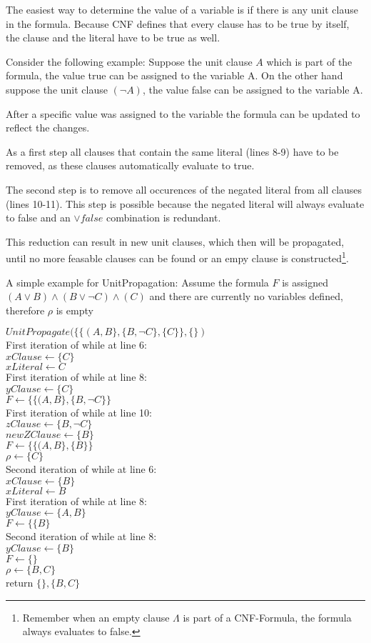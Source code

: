 The easiest way to determine the value of a variable is if there is any unit clause in the formula. Because CNF defines that every clause has to be true by itself, the clause and the literal have to be true as well.

Consider the following example: Suppose the unit clause $A$ which is part of the formula, the value true can be assigned to the variable A. On the other hand suppose the unit clause $(\lnot A)$, the value false can be assigned to the variable A.

After a specific value was assigned to the variable the formula can be updated to reflect the changes. 

As a first step all clauses that contain the same literal (lines 8-9) have to be removed, as these clauses automatically evaluate to true. 

The second step is to remove all occurences of the negated literal from all clauses (lines 10-11). This step is possible because the negated literal will always evaluate to false and an $\lor false$ combination is redundant.

This reduction can result in new unit clauses, which then will be propagated, until no more feasable clauses can be found or an empy clause is constructed\footnote{Remember when an empty clause $\Lambda$ is part of a CNF-Formula, the formula always evaluates to false.}.

A simple example for UnitPropagation: 
Assume the formula $F$ is assigned $(A \lor B ) \land (B \lor \lnot C) \land (C)$ and there are currently no variables defined, therefore $\rho$ is empty

$UnitPropagate(\{\{(A,B\}, \{B, \lnot C\},\{C\}\}, \{\})$\\
First iteration of while at line 6: \\
$xClause \gets \{C\}$\\
$xLiteral \gets C$\\
First iteration of while at line 8:\\
$yClause \gets \{C\}$\\
$F \gets \{\{(A,B\}, \{B, \lnot C\}\}$\\
First iteration of while at line 10:\\
$zClause \gets \{B, \lnot C\}$ \\
$newZClause \gets \{B\}$\\
$F \gets \{\{(A,B\}, \{B\}\}$ \\
$\rho \gets \{C\}$\\
Second iteration of while at line 6: \\
$xClause \gets \{B\}$\\
$xLiteral \gets B$\\
First iteration of while at line 8:\\
$yClause \gets \{A,B\}$\\
$F \gets \{\{B\}$\\
Second iteration of while at line 8:\\
$yClause \gets \{B\}$\\
$F \gets \{\}$\\
$\rho \gets \{B, C\}$\\
return $\{\}, \{B, C\}$


